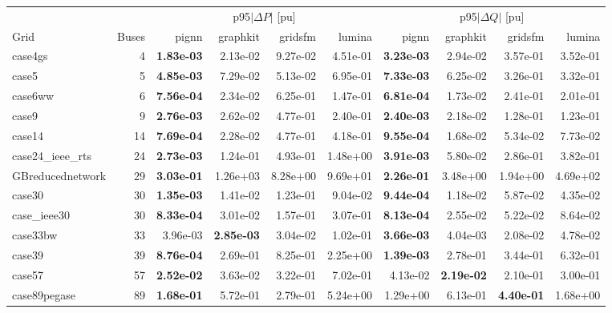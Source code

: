\documentclass[10pt]{article}
\begin{document}
\begin{table}[H]
\centering\small
\setlength{\tabcolsep}{3.5pt}
\begin{tabular}{lr rrrr rrrr}
\toprule
 & & \multicolumn{4}{c}{p95$|\Delta P|$ [pu]} & \multicolumn{4}{c}{p95$|\Delta Q|$ [pu]} \\
\cmidrule(lr){3-6}\cmidrule(lr){7-10}
Grid & Buses & pignn & graphkit & gridsfm & lumina & pignn & graphkit & gridsfm & lumina \\
\midrule
case4gs & 4 & \textbf{1.83e-03} & 2.13e-02 & 9.27e-02 & 4.51e-01 & \textbf{3.23e-03} & 2.94e-02 & 3.57e-01 & 3.52e-01 \\
case5 & 5 & \textbf{4.85e-03} & 7.29e-02 & 5.13e-02 & 6.95e-01 & \textbf{7.33e-03} & 6.25e-02 & 3.26e-01 & 3.32e-01 \\
case6ww & 6 & \textbf{7.56e-04} & 2.34e-02 & 6.25e-01 & 1.47e-01 & \textbf{6.81e-04} & 1.73e-02 & 2.41e-01 & 2.01e-01 \\
case9 & 9 & \textbf{2.76e-03} & 2.62e-02 & 4.77e-01 & 2.40e-01 & \textbf{2.40e-03} & 2.18e-02 & 1.28e-01 & 1.23e-01 \\
case14 & 14 & \textbf{7.69e-04} & 2.28e-02 & 4.77e-01 & 4.18e-01 & \textbf{9.55e-04} & 1.68e-02 & 5.34e-02 & 7.73e-02 \\
case24\_ieee\_rts & 24 & \textbf{2.73e-03} & 1.24e-01 & 4.93e-01 & 1.48e+00 & \textbf{3.91e-03} & 5.80e-02 & 2.86e-01 & 3.82e-01 \\
GBreducednetwork & 29 & \textbf{3.03e-01} & 1.26e+03 & 8.28e+00 & 9.69e+01 & \textbf{2.26e-01} & 3.48e+00 & 1.94e+00 & 4.69e+02 \\
case30 & 30 & \textbf{1.35e-03} & 1.41e-02 & 1.23e-01 & 9.04e-02 & \textbf{9.44e-04} & 1.18e-02 & 5.87e-02 & 4.35e-02 \\
case\_ieee30 & 30 & \textbf{8.33e-04} & 3.01e-02 & 1.57e-01 & 3.07e-01 & \textbf{8.13e-04} & 2.55e-02 & 5.22e-02 & 8.64e-02 \\
case33bw & 33 & 3.96e-03 & \textbf{2.85e-03} & 3.04e-02 & 1.02e-01 & \textbf{3.66e-03} & 4.04e-03 & 2.08e-02 & 4.78e-02 \\
case39 & 39 & \textbf{8.76e-04} & 2.69e-01 & 8.25e-01 & 2.25e+00 & \textbf{1.39e-03} & 2.78e-01 & 3.44e-01 & 6.32e-01 \\
case57 & 57 & \textbf{2.52e-02} & 3.63e-02 & 3.22e-01 & 7.02e-01 & 4.13e-02 & \textbf{2.19e-02} & 2.10e-01 & 3.00e-01 \\
case89pegase & 89 & \textbf{1.68e-01} & 5.72e-01 & 2.79e-01 & 5.24e+00 & 1.29e+00 & 6.13e-01 & \textbf{4.40e-01} & 1.68e+00 \\

\end{tabular}
\end{table}
\end{document}
